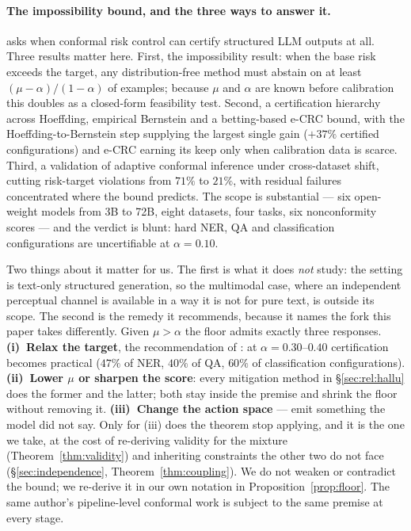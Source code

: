 \documentclass{article}
\theoremstyle{plain}
\theoremstyle{definition}
\theoremstyle{remark}
\begin{document}
\paragraph{The impossibility bound, and the three ways to answer it.}
\citet{crcimposs} asks when conformal risk control can certify structured LLM outputs at
all. Three results matter here. First, the impossibility result: when the base risk exceeds
the target, any distribution-free method must abstain on at least $(\mu-\alpha)/(1-\alpha)$ of
examples; because $\mu$ and $\alpha$ are known before calibration this doubles as a
closed-form feasibility test. Second, a certification hierarchy across Hoeffding, empirical
Bernstein and a betting-based e-CRC bound, with the Hoeffding-to-Bernstein step supplying the
largest single gain ($+37\%$ certified configurations) and e-CRC earning its keep only when
calibration data is scarce. Third, a validation of adaptive conformal inference under
cross-dataset shift, cutting risk-target violations from $71\%$ to $21\%$, with residual
failures concentrated where the bound predicts. The scope is substantial --- six open-weight
models from 3B to 72B, eight datasets, four tasks, six nonconformity scores --- and the verdict
is blunt: hard NER, QA and classification configurations are uncertifiable at $\alpha=0.10$.

Two things about it matter for us. The first is what it does \emph{not} study: the setting is
text-only structured generation, so the multimodal case, where an independent perceptual
channel is available in a way it is not for pure text, is outside its scope. The second is the
remedy it recommends, because it names the fork this paper takes differently. Given $\mu>\alpha$
the floor admits exactly three responses. \textbf{(i)~Relax the target}, the recommendation of
\citet{crcimposs}: at $\alpha=0.30$--$0.40$ certification becomes practical ($47\%$ of NER,
$40\%$ of QA, $60\%$ of classification configurations). \textbf{(ii)~Lower $\mu$ or sharpen the
score}: every mitigation method in \S\ref{sec:rel:hallu} does the former and \citet{bcea} the
latter; both stay inside the premise and shrink the floor without removing it.
\textbf{(iii)~Change the action space} --- emit something the model did not say. Only for (iii)
does the theorem stop applying, and it is the one we take, at the cost of re-deriving validity
for the mixture (Theorem~\ref{thm:validity}) and inheriting constraints the other two do not
face (\S\ref{sec:independence}, Theorem~\ref{thm:coupling}). We do not weaken or contradict the
bound; we re-derive it in our own notation in Proposition~\ref{prop:floor}. The same author's
pipeline-level conformal work \citep{pasc} is subject to the same premise at every stage.
\end{document}
